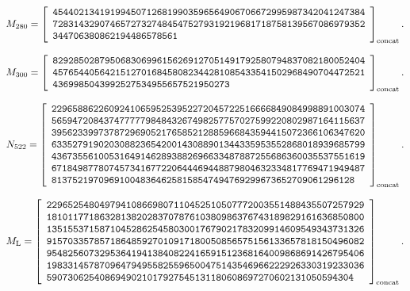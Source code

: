 \[
M_{280}=\left[\begin{array}{l}
\mathtt{454402134191994507126819903596564906706672995987342041247384}\\
\mathtt{728314329074657273274845475279319219681718758139567086979352}\\
\mathtt{344706380862194486578561}
\end{array}\right]_{\rm concat}.
\]

\[
M_{300}=\left[\begin{array}{l}
\mathtt{829285028795068306996156269127051491792580794837082180052404}\\
\mathtt{457654405642151270168458082344281085433541502968490704472521}\\
\mathtt{4369985043992527534955657521950273}
\end{array}\right]_{\rm concat}.
\]

\[
N_{522}=\left[\begin{array}{l}
\mathtt{229658862260924106595253952272045722516666849084998891003074}\\
\mathtt{565947208437477777984843267498257757027599220802987164115637}\\
\mathtt{395623399737872969052176585212885966843594415072366106347620}\\
\mathtt{633527919020308823654200143088901344335953552868018939685799}\\
\mathtt{436735561005316491462893882696633487887255686360035537551619}\\
\mathtt{671849877807457341677220644469448879804632334817769471949487}\\
\mathtt{8137521970969100483646258158547494769299673652709061296128}
\end{array}\right]_{\rm concat}.
\]

\[
M_{\rm L}=\left[\begin{array}{l}
\mathtt{229652548049794108669807110452510507772003551488435507257929}\\
\mathtt{181011771863281382028370787610380986376743189829161636850800}\\
\mathtt{135155371587104528625458030017679021783209914609549343731326}\\
\mathtt{915703357857186485927010917180050856575156133657818150496082}\\
\mathtt{954825607329536419413840822416591512368164009868691426795406}\\
\mathtt{198331457870964794955825596500475143546966222926330319233036}\\
\mathtt{5907306254086949021017927545131180608697270602131050594304}
\end{array}\right]_{\rm concat}.
\]
